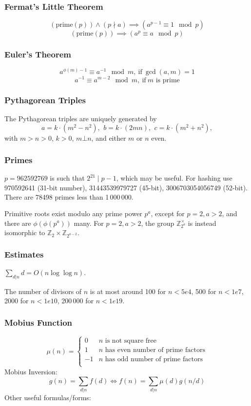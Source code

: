 \documentclass[
	a4paper,
	landscape,
	10pt,
]{article}
\begin{document}
\begin{multicols}{3}
        \subsubsection*{Fermat's Little Theorem}
        $$
        (\text{prime}(p)) \land (p \nmid a) \implies (a^{p-1} \equiv 1 \mod p)
        $$
        $$
        (\text{prime}(p)) \implies (a^p \equiv a \mod p) 
        $$
		\subsubsection*{Euler's Theorem}
		$$
		a^{\phi(m)-1} \equiv a^{-1} \mod m,~ \text{if}~ \gcd(a,m) = 1
		$$
		$$
		a^{-1} \equiv a^{m-2} \mod m,~ \text{if}~ m \text{ is prime}
		$$


\subsubsection*{Pythagorean Triples}
 The Pythagorean triples are uniquely generated by
 \[ a=k\cdot (m^{2}-n^{2}),\ \,b=k\cdot (2mn),\ \,c=k\cdot (m^{2}+n^{2}), \]
 with $m > n > 0$, $k > 0$, $m \bot n$, and either $m$ or $n$ even.

\subsubsection*{Primes}
	$p=962592769$ is such that $2^{21} \mid p-1$, which may be useful. For hashing
	use 970592641 (31-bit number), 31443539979727 (45-bit), 3006703054056749
	(52-bit). There are 78498 primes less than 1\,000\,000.

	Primitive roots exist modulo any prime power $p^a$, except for $p = 2, a > 2$, and there are $\phi(\phi(p^a))$ many.
	For $p = 2, a > 2$, the group $\mathbb Z_{2^a}^\times$ is instead isomorphic to $\mathbb Z_2 \times \mathbb Z_{2^{a-2}}$.

\subsubsection*{Estimates}
	$\sum_{d|n} d = O(n \log \log n)$.

	The number of divisors of $n$ is at most around 100 for $n < 5e4$, 500 for $n < 1e7$, 2000 for $n < 1e10$, 200\,000 for $n < 1e19$.

\subsubsection*{Mobius Function}
\[
	\mu(n) = \begin{cases} 0 & n \textrm{ is not square free}\\ 1 & n \textrm{ has even number of prime factors}\\ -1 & n \textrm{ has odd number of prime factors}\\\end{cases}
\]
  Mobius Inversion:
  \[ g(n) = \sum_{d|n} f(d) \Leftrightarrow f(n) = \sum_{d|n} \mu(d)g(n/d) \]
  Other useful formulas/forms:


\end{multicols}
\end{document}
